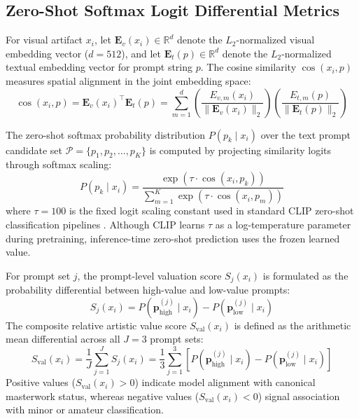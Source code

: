 \documentclass[pdflatex,sn-mathphys-num]{sn-jnl}%
\theoremstyle{thmstyleone}%
\theoremstyle{thmstyletwo}%
\theoremstyle{thmstylethree}%
\begin{document}
\subsection{Zero-Shot Softmax Logit Differential Metrics}
For visual artifact $x_i$, let $\mathbf{E}_v(x_i) \in \mathbb{R}^d$ denote the $L_2$-normalized visual embedding vector ($d=512$), and let $\mathbf{E}_t(p) \in \mathbb{R}^d$ denote the $L_2$-normalized textual embedding vector for prompt string $p$. The cosine similarity $\cos(x_i, p)$ measures spatial alignment in the joint embedding space:
\begin{equation}
\cos(x_i, p) = \mathbf{E}_v(x_i)^\top \mathbf{E}_t(p) = \sum_{m=1}^{d} \left(\frac{E_{v,m}(x_i)}{\|\mathbf{E}_v(x_i)\|_2}\right) \left(\frac{E_{t,m}(p)}{\|\mathbf{E}_t(p)\|_2}\right)
\end{equation}

The zero-shot softmax probability distribution $P(p_k \mid x_i)$ over the text prompt candidate set $\mathcal{P} = \{p_1, p_2, \dots, p_K\}$ is computed by projecting similarity logits through softmax scaling:
\begin{equation}
P(p_k \mid x_i) = \frac{\exp\left(\tau \cdot \cos(x_i, p_k)\right)}{\sum_{m=1}^{K} \exp\left(\tau \cdot \cos(x_i, p_m)\right)}
\end{equation}
where $\tau = 100$ is the fixed logit scaling constant used in standard CLIP zero-shot classification pipelines \cite{radford2021learning}. Although CLIP learns $\tau$ as a log-temperature parameter during pretraining, inference-time zero-shot prediction uses the frozen learned value.

For prompt set $j$, the prompt-level valuation score $S_{j}(x_i)$ is formulated as the probability differential between high-value and low-value prompts:
\begin{equation}
S_{j}(x_i) = P(\mathbf{p}_{\text{high}}^{(j)} \mid x_i) - P(\mathbf{p}_{\text{low}}^{(j)} \mid x_i)
\end{equation}
The composite relative artistic value score $S_{\text{val}}(x_i)$ is defined as the arithmetic mean differential across all $J=3$ prompt sets:
\begin{equation}
S_{\text{val}}(x_i) = \frac{1}{J} \sum_{j=1}^{J} S_{j}(x_i) = \frac{1}{3} \sum_{j=1}^{3} \left[ P(\mathbf{p}_{\text{high}}^{(j)} \mid x_i) - P(\mathbf{p}_{\text{low}}^{(j)} \mid x_i) \right]
\end{equation}
Positive values ($S_{\text{val}}(x_i) > 0$) indicate model alignment with canonical masterwork status, whereas negative values ($S_{\text{val}}(x_i) < 0$) signal association with minor or amateur classification.
\end{document}
